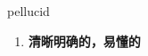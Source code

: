 
\begin{frame}
{\huge pellucid}
\begin{center}
\begin{enumerate}\Large
  \item \textbf{清晰明确的，易懂的}
\end{enumerate}
\end{center}
\end{frame}
